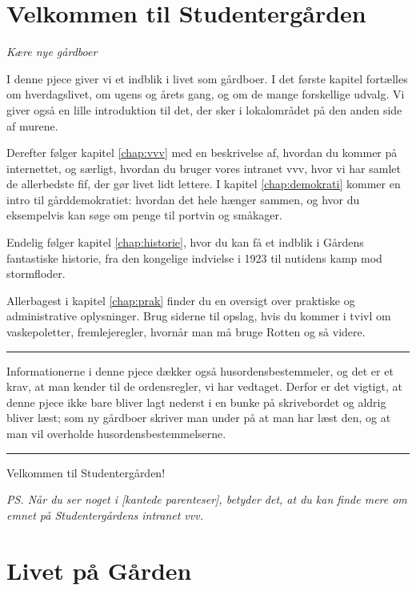 \documentclass[11pt,article,twoside,openany,danish,extrafontsizes]{memoir} %
\begin{document}
\mainmatter

\chapter*{Velkommen til Studentergården}
\textit{Kære nye gårdboer}

\medskip

\noindent
I denne pjece giver vi et indblik i livet som gårdboer. I det første kapitel fortælles om hverdagslivet, om ugens og årets gang, og om de mange forskellige udvalg. Vi giver også en lille introduktion til det, der sker i lokalområdet på den anden side af murene.


Derefter følger kapitel \vref{chap:vvv} med en beskrivelse af, hvordan du kommer på internettet, og særligt, hvordan du bruger vores intranet vvv, hvor vi har samlet de allerbedste fif, der gør livet lidt lettere. I kapitel \vref{chap:demokrati} kommer en intro til gårddemokratiet: hvordan det hele hænger sammen, og hvor du eksempelvis kan søge om penge til portvin og småkager.

Endelig følger kapitel \vref{chap:historie}, hvor du kan få et indblik i Gårdens fantastiske historie, fra den kongelige indvielse i 1923 til nutidens kamp mod stormfloder.

Allerbagest i kapitel \vref{chap:prak} finder du en oversigt over praktiske og administrative oplysninger. Brug siderne til opslag, hvis du kommer i tvivl om vaskepoletter, fremlejeregler, hvornår man må bruge Rotten og så videre.

\plainbreak{1}

Informationerne i denne pjece dækker også husordensbestemmeler, og det er et krav, at man kender til de ordensregler, vi har vedtaget. Derfor er det vigtigt, at denne pjece ikke bare bliver lagt nederst i en bunke på skrivebordet og aldrig bliver læst; som ny gårdboer skriver man under på at man har læst den, og at man vil overholde husordensbestemmelserne.

\plainbreak{1}

Velkommen til Studentergården!

\vfill

\noindent
\textit{PS. Når du ser noget i [kantede parenteser], betyder det, at du kan finde mere om emnet på Studentergårdens intranet vvv.}


\clearpage
\tableofcontents*
\clearpage

\chapter{Livet på Gården}
\label{chap:liv}
\end{document}
